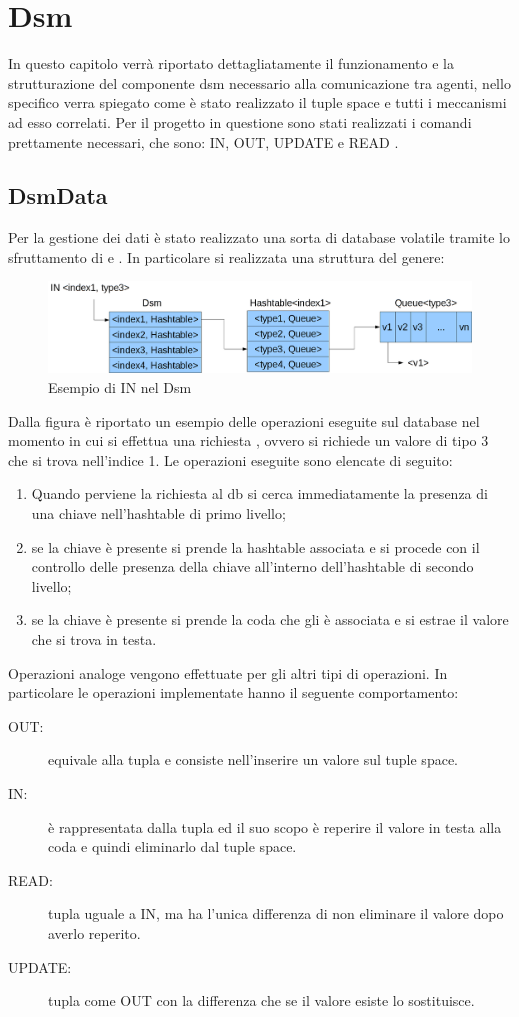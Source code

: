 \chapter{Dsm}
In questo capitolo verrà riportato dettagliatamente il funzionamento e la strutturazione del componente dsm necessario alla comunicazione tra agenti, nello specifico verra spiegato come è stato realizzato il tuple space e tutti i meccanismi ad esso correlati.
Per il progetto in questione sono stati realizzati i comandi prettamente necessari, che sono: IN, OUT, UPDATE e READ \cite{linda}.
\section{DsmData}
Per la gestione dei dati è stato realizzato una sorta di database volatile tramite lo sfruttamento di  e . In particolare si realizzata una struttura del genere:
\begin{figure}[H]
\begin{center}
\includegraphics[scale=0.3]{etc/dsm.png}
\caption{Esempio di IN nel Dsm}
\label{dsm1}
\end{center}
\end{figure}
Dalla figura è riportato un esempio delle operazioni eseguite sul database nel momento in cui si effettua una richiesta , ovvero si richiede un valore di tipo 3 che si trova nell'indice 1. Le operazioni eseguite sono elencate di seguito:
\begin{enumerate}
	\item Quando perviene la richiesta al db si cerca immediatamente la presenza di una chiave  nell'hashtable di primo livello;
	\item se la chiave è presente si prende la hashtable associata e si procede con il controllo delle presenza della chiave  all'interno dell'hashtable di secondo livello;
	\item se la chiave è presente si prende la coda che gli è associata e si estrae il valore che si trova in testa.
\end{enumerate}
Operazioni analoge vengono effettuate per gli altri tipi di operazioni. In particolare le operazioni implementate hanno il seguente comportamento:
\begin{description}
	\item[OUT:] equivale alla tupla  e consiste nell'inserire un valore sul tuple space.
	\item[IN:] è rappresentata dalla tupla  ed il suo scopo è reperire il valore in testa alla coda e quindi eliminarlo dal tuple space.
	\item[READ:] tupla uguale a IN, ma ha l'unica differenza di non eliminare il valore dopo averlo reperito.
	\item[UPDATE:] tupla come OUT con la differenza che se il valore esiste lo sostituisce.
\end{description}
